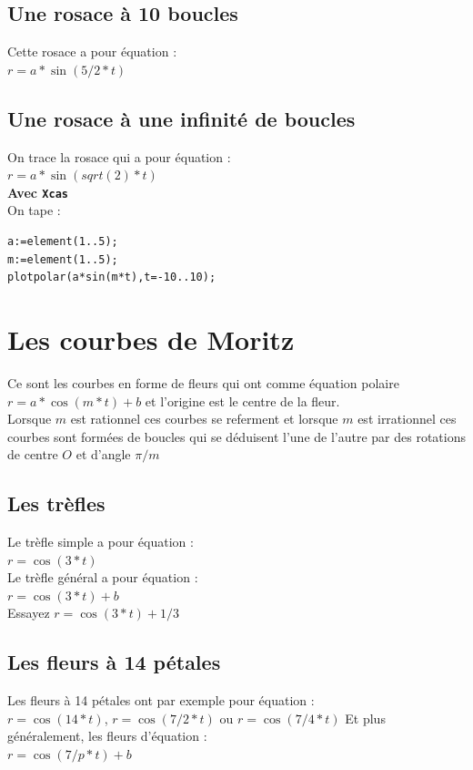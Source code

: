 \documentclass[a4paper,11pt]{book}
\begin{document}
\subsection{Une rosace \`a 10 boucles}
Cette rosace a pour \'equation :\\
$r=a*\sin(5/2*t)$\\
\subsection{Une rosace \`a une infinit\'e de  boucles}
On trace la rosace qui a pour \'equation :\\
$r=a*\sin(sqrt(2)*t)$\\
{\bf Avec {\tt Xcas}}\\
On tape :\\
\begin{verbatim}
a:=element(1..5);
m:=element(1..5);
plotpolar(a*sin(m*t),t=-10..10);
\end{verbatim}
\section{Les courbes de Moritz}
Ce sont les courbes en forme de fleurs qui ont comme \'equation polaire 
$r=a*\cos(m*t)+b$ et 
l'origine est le centre de la fleur.\\
Lorsque $m$ est rationnel ces courbes se referment et lorsque $m$ est 
irrationnel ces courbes sont form\'ees de boucles qui se d\'eduisent l'une de l'autre par des rotations de centre $O$ et d'angle $\pi/m$ 
\subsection{Les tr\`efles}
Le tr\`efle simple a pour \'equation :\\
$r=\cos(3*t)$\\
Le tr\`efle g\'en\'eral a pour \'equation :\\
$r=\cos(3*t)+b$\\
Essayez $r=\cos(3*t)+1/3$

\subsection{Les fleurs \`a 14 p\'etales}
Les fleurs \`a 14 p\'etales ont par exemple pour \'equation :\\
$r=\cos(14*t)$, $r=\cos(7/2*t)$ ou $r=\cos(7/4*t)$
Et plus  g\'en\'eralement, les fleurs d'\'equation :\\
$r=\cos(7/p*t)+b$\\
\end{document}
